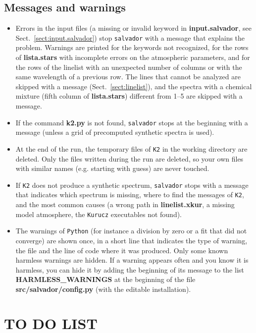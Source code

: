 \documentclass[modern]{aastex701}
\begin{document}
\subsection{Messages and warnings}
\begin{itemize}
    \item Errors in the input files (a missing or invalid keyword in {\bf input.salvador}, see Sect.~\ref{sect:input.salvador}) stop \texttt{salvador} with a message that explains the problem. Warnings are printed for the keywords not recognized, for the rows of {\bf lista.stars} with incomplete errors on the atmospheric parameters, and for the rows of the linelist with an unexpected number of columns or with the same wavelength of a previous row. The lines that cannot be analyzed are skipped with a message (Sect.~\ref{sect:linelist}), and the spectra with a chemical mixture (fifth column of {\bf lista.stars}) different from 1--5 are skipped with a message.
    \item If the command {\bf k2.py} is not found, \texttt{salvador} stops at the beginning with a message (unless a grid of precomputed synthetic spectra is used).
    \item At the end of the run, the temporary files of \texttt{K2} in the working directory are deleted. Only the files written during the run are deleted, so your own files with similar names (e.g. starting with guess) are never touched.
    \item If \texttt{K2} does not produce a synthetic spectrum, \texttt{salvador} stops with a message that indicates which spectrum is missing, where to find the messages of \texttt{K2}, and the most common causes (a wrong path in {\bf linelist.xkur}, a missing model atmosphere, the \texttt{Kurucz} executables not found).
    \item The warnings of \texttt{Python} (for instance a division by zero or a fit that did not converge) are shown once, in a short line that indicates the type of warning, the file and the line of code where it was produced. Only some known harmless warnings are hidden. If a warning appears often and you know it is harmless, you can hide it by adding the beginning of its message to the list {\bf HARMLESS\_WARNINGS} at the beginning of the file {\bf src/salvador/config.py} (with the editable installation).
\end{itemize}

\section{TO DO LIST}
\end{document}
